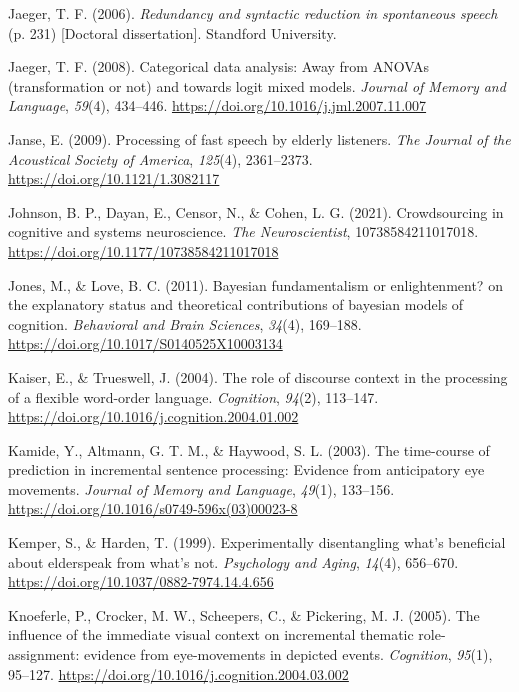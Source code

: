 \documentclass[a4paper, nobind]{templates/ociamthesis}
\newlength{\cslhangindent}
\newenvironment{CSLReferences}[2] %
 {%
  \setlength{\parindent}{0pt}
  \ifodd #1
  \let\oldpar\par
  \def\par{\hangindent=\cslhangindent\oldpar}
  \fi
  \setlength{\parskip}{1mm}
  \setlength{\baselineskip}{6mm}
 }%
 {}
\begin{document}
\begin{CSLReferences}{1}{0}
\leavevmode{}%
Jaeger, T. F. (2006). \emph{{Redundancy and syntactic reduction in spontaneous speech}} (p. 231) {[}Doctoral dissertation{]}. Standford University.

\leavevmode{}%
Jaeger, T. F. (2008). {Categorical data analysis: Away from ANOVAs (transformation or not) and towards logit mixed models}. \emph{Journal of Memory and Language}, \emph{59}(4), 434--446. \url{https://doi.org/10.1016/j.jml.2007.11.007}

\leavevmode{}%
Janse, E. (2009). {Processing of fast speech by elderly listeners}. \emph{The Journal of the Acoustical Society of America}, \emph{125}(4), 2361--2373. \url{https://doi.org/10.1121/1.3082117}

\leavevmode{}%
Johnson, B. P., Dayan, E., Censor, N., \& Cohen, L. G. (2021). {Crowdsourcing in cognitive and systems neuroscience}. \emph{The Neuroscientist}, 10738584211017018. \url{https://doi.org/10.1177/10738584211017018}

\leavevmode{}%
Jones, M., \& Love, B. C. (2011). {Bayesian fundamentalism or enlightenment? on the explanatory status and theoretical contributions of bayesian models of cognition}. \emph{Behavioral and Brain Sciences}, \emph{34}(4), 169--188. \url{https://doi.org/10.1017/S0140525X10003134}

\leavevmode{}%
Kaiser, E., \& Trueswell, J. (2004). The role of discourse context in the processing of a flexible word-order language. \emph{Cognition}, \emph{94}(2), 113--147. \url{https://doi.org/10.1016/j.cognition.2004.01.002}

\leavevmode{}%
Kamide, Y., Altmann, G. T. M., \& Haywood, S. L. (2003). The time-course of prediction in incremental sentence processing: Evidence from anticipatory eye movements. \emph{Journal of Memory and Language}, \emph{49}(1), 133--156. \url{https://doi.org/10.1016/s0749-596x(03)00023-8}

\leavevmode{}%
Kemper, S., \& Harden, T. (1999). {Experimentally disentangling what's beneficial about elderspeak from what's not}. \emph{Psychology and Aging}, \emph{14}(4), 656--670. \url{https://doi.org/10.1037/0882-7974.14.4.656}

\leavevmode{}%
Knoeferle, P., Crocker, M. W., Scheepers, C., \& Pickering, M. J. (2005). The influence of the immediate visual context on incremental thematic role-assignment: evidence from eye-movements in depicted events. \emph{Cognition}, \emph{95}(1), 95--127. \url{https://doi.org/10.1016/j.cognition.2004.03.002}


\end{CSLReferences}
\end{document}
